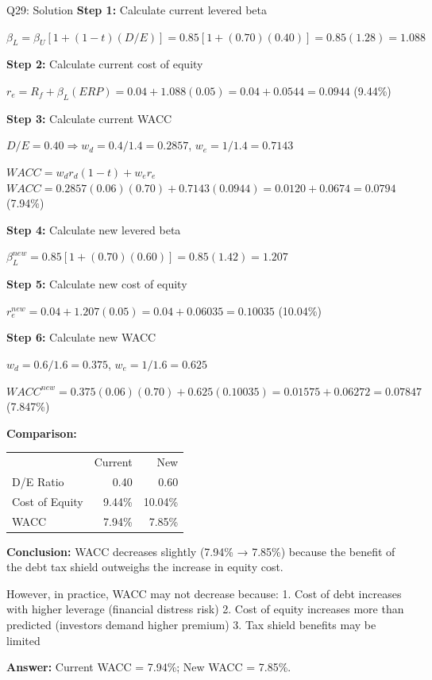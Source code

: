 \documentclass{beamer}
\renewcommand{\scriptsize}{\fontsize{6pt}{7pt}\selectfont}
\begin{document}
	\begin{frame}{Q29: Solution}
		\scriptsize
		\textbf{Step 1:} Calculate current levered beta
		
		$\beta_L = \beta_U[1 + (1-t)(D/E)] = 0.85[1 + (0.70)(0.40)] = 0.85(1.28) = 1.088$
		
		\vspace{2pt}
		\textbf{Step 2:} Calculate current cost of equity
		
		$r_e = R_f + \beta_L(ERP) = 0.04 + 1.088(0.05) = 0.04 + 0.0544 = 0.0944$ (9.44\%)
		
		\vspace{2pt}
		\textbf{Step 3:} Calculate current WACC
		
		$D/E = 0.40 \Rightarrow w_d = 0.4/1.4 = 0.2857$, $w_e = 1/1.4 = 0.7143$
		
		$WACC = w_d r_d(1-t) + w_e r_e$
		$WACC = 0.2857(0.06)(0.70) + 0.7143(0.0944) = 0.0120 + 0.0674 = 0.0794$ (7.94\%)
		
		\vspace{2pt}
		\textbf{Step 4:} Calculate new levered beta
		
		$\beta_L^{new} = 0.85[1 + (0.70)(0.60)] = 0.85(1.42) = 1.207$
		
		\vspace{2pt}
		\textbf{Step 5:} Calculate new cost of equity
		
		$r_e^{new} = 0.04 + 1.207(0.05) = 0.04 + 0.06035 = 0.10035$ (10.04\%)
		
		\vspace{2pt}
		\textbf{Step 6:} Calculate new WACC
		
		$w_d = 0.6/1.6 = 0.375$, $w_e = 1/1.6 = 0.625$
		
		$WACC^{new} = 0.375(0.06)(0.70) + 0.625(0.10035) = 0.01575 + 0.06272 = 0.07847$ (7.847\%)
		
		\vspace{2pt}
		\textbf{Comparison:}
		\begin{tabular}{lrr}
			& Current & New \\
			D/E Ratio & 0.40 & 0.60 \\
			Cost of Equity & 9.44\% & 10.04\% \\
			WACC & 7.94\% & 7.85\% \\
		\end{tabular}
		
		\vspace{2pt}
		\textbf{Conclusion:} WACC decreases slightly (7.94\% → 7.85\%) because the benefit of the debt tax shield outweighs the increase in equity cost.
		
		However, in practice, WACC may not decrease because:
		1. Cost of debt increases with higher leverage (financial distress risk)
		2. Cost of equity increases more than predicted (investors demand higher premium)
		3. Tax shield benefits may be limited
		
		\textbf{Answer:} Current WACC = 7.94\%; New WACC = 7.85\%.
	\end{frame}
	
\end{document}
